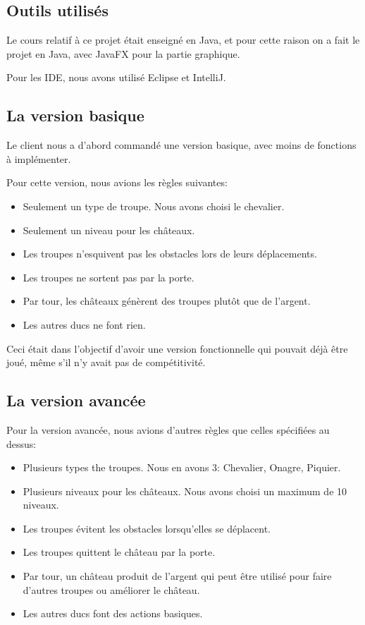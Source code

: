 \documentclass[12pt, a4paper]{report}
\begin{document}
\subsection*{Outils utilisés}

Le cours relatif à ce projet était enseigné en Java, et pour cette raison on a fait le projet en Java, avec JavaFX pour la partie graphique.

Pour les IDE, nous avons utilisé Eclipse et IntelliJ.

\subsection*{La version basique}

Le client nous a d'abord commandé une version basique, avec moins de fonctions à implémenter.

Pour cette version, nous avions les règles suivantes:

\begin{itemize}
    \item Seulement un type de troupe. Nous avons choisi le chevalier.
    \item Seulement un niveau pour les châteaux.
    \item Les troupes n'esquivent pas les obstacles lors de leurs déplacements.
    \item Les troupes ne sortent pas par la porte.
    \item Par tour, les châteaux génèrent des troupes plutôt que de l'argent.
    \item Les autres ducs ne font rien.
\end{itemize}

Ceci était dans l'objectif d'avoir une version fonctionnelle qui pouvait déjà être joué, même s'il n'y avait pas de compétitivité.

\subsection*{La version avancée}

Pour la version avancée, nous avions d'autres règles que celles spécifiées au dessus:

\begin{itemize}
    \item Plusieurs types the troupes. Nous en avons 3: Chevalier, Onagre, Piquier.
    \item Plusieurs niveaux pour les châteaux. Nous avons choisi un maximum de 10 niveaux.
    \item Les troupes évitent les obstacles lorsqu'elles se déplacent.
    \item Les troupes quittent le château par la porte.
    \item Par tour, un château produit de l'argent qui peut être utilisé pour faire d'autres troupes ou améliorer le château.
    \item Les autres ducs font des actions basiques.
\end{itemize}
\end{document}
